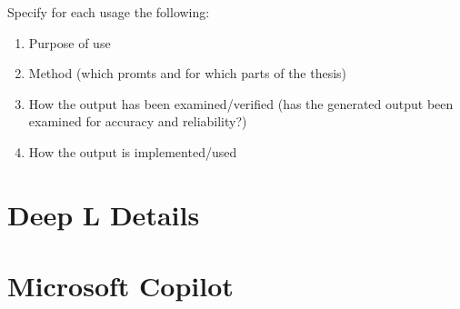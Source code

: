 \documentclass[12pt,a4paper]{book}
\theoremstyle{definition}
\theoremstyle{remark}
\begin{document}
Specify for each usage the following:

\begin{enumerate}
    \item Purpose of use
    \item Method (which promts and for which parts of the thesis)
    \item How the output has been examined/verified (has the generated output been examined for accuracy and reliability?)
    \item How the output is implemented/used
\end{enumerate}

\section{Deep L Details}
\label{sectionDeepL}
\section{Microsoft Copilot}
\label{sectionCopilot}
\end{document}

